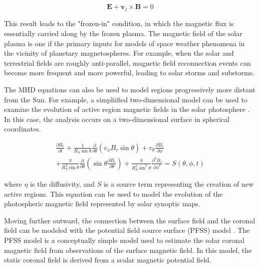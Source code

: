 \documentclass{article}
\begin{document}
\begin{equation}
    \mathbf E + \mathbf v_j \times \mathbf B = 0
    \label{eq:IdealMHDOhmLaw}
\end{equation}

\noindent This result leads to the "frozen-in" condition, in which the magnetic flux is essentially carried along by the frozen plasma. The magnetic field of the solar plasma is one if the primary inputs for models of space weather phenomena in the vicinity of planetary magnetospheres. For example, when the solar and terrestrial fields are roughly anti-parallel, magnetic field reconnection events can become more frequent and more powerful, leading to solar storms and substorms.

The MHD equations can also be used to model regions progressively more distant from the Sun. For example, a simpliified two-dimensional model can be used to examine the evolution of active region magnetic fields in the solar photosphere \cite{russell2016}. In this case, the analysis occurs on a two-dimensional surface in spherical coordinates.

\begin{equation}
\begin{split}
    \frac {\partial B_r} {\partial t} + \frac {1} {R_S \sin \theta} \frac {\partial} {\partial \theta} \left( v_{\phi} B_r \sin \theta \right) + v_{\theta} \frac {\partial B_r} {\partial \phi} \\
    + \frac {\eta} {R_S^2 \sin \theta} \frac {\partial} {\partial \theta} \left( \sin \theta \frac {\partial B_r} {\partial \theta} \right) + \frac {\eta} {R_S^2 \sin^2 \theta} \frac {\partial^2 B_r} {\partial \phi^2} = S(\theta, \phi, t)
    \label{eq:PhotosphereField}
\end{split}
\end{equation}

\noindent where $\eta$ is the diffusivity, and $S$ is a source term representing the creation of new active regions. This equation can be used to model the evolution of the photospheric magnetic field represented by solar synoptic maps.

Moving further outward, the connection between the surface field and the coronal field can be modeled with the potential field source surface (PFSS) model \cite{Altschuler1969}. The PFSS model is a conceptually simple model used to estimate the solar coronal magnetic field from observations of the surface magnetic field. In this model, the static coronal field is derived from a scalar magnetic potential field.
\end{document}
